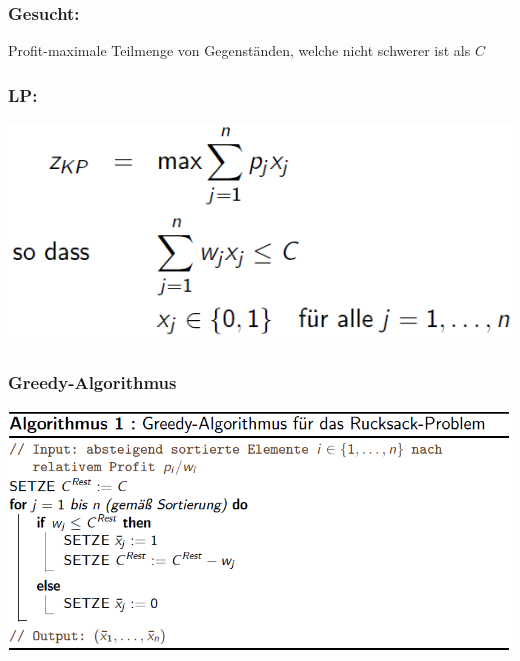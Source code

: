 \documentclass[12pt]{article}
\begin{document}
			\subsubsection*{Gesucht:}
			Profit-maximale Teilmenge von Gegenständen, welche nicht schwerer ist als $C$
			
			\subsubsection*{LP:}
				\includegraphics*[scale=0.6]{KSLP}
			
			\subsubsection*{Greedy-Algorithmus}\label{KPGreedy}
			\includegraphics[scale=0.6]{KPGreedy}
\end{document}

